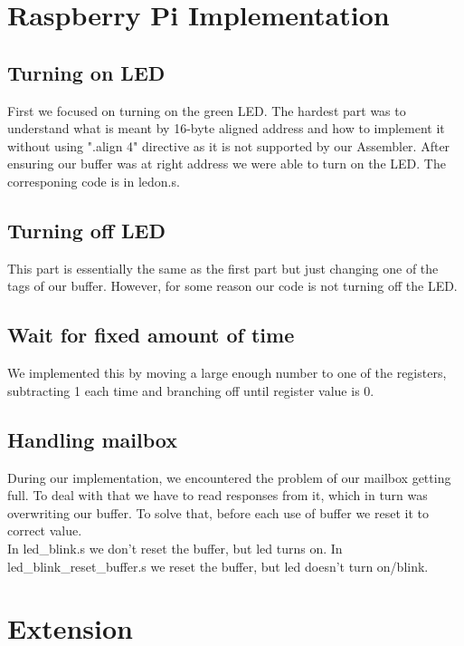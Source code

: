 \documentclass[11pt]{article}
\begin{document}
\section{Raspberry Pi Implementation}

\subsection{Turning on LED}
First we focused on turning on the green LED. The hardest part was to understand what is meant by 16-byte aligned address and 
how to implement it without using ".align 4" directive as it is not supported by our Assembler. After ensuring our buffer was 
at right address we were able to turn on the LED.
\newline
The corresponing code is in ledon.s.

\subsection{Turning off LED}
This part is essentially the same as the first part but just changing one of the tags of our buffer. However, for some reason 
our code is not turning off the LED.

\subsection{Wait for fixed amount of time}
We implemented this by moving a large enough number to one of the registers, subtracting 1 each time and branching off 
until register value is 0.

\subsection{Handling mailbox}

During our implementation, we encountered the problem of our mailbox getting full.
To deal with that we have to read responses from it, which in turn was overwriting our buffer. 
To solve that, before each use of buffer we reset it to correct value.
\\[1\baselineskip]
In led\_blink.s we don't reset the buffer, but led turns on.
\newline
In led\_blink\_reset\_buffer.s we reset the buffer, but led doesn't turn on/blink.

\section{Extension}
\end{document}
